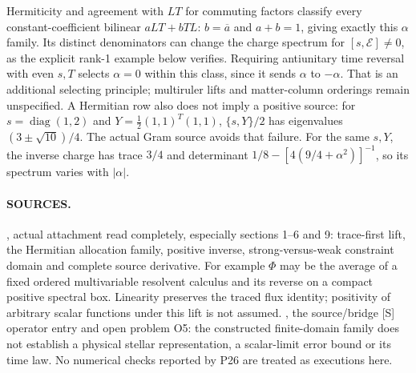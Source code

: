 Hermiticity and agreement with $LT$ for commuting factors classify
every constant-coefficient bilinear $aLT+bTL$:
$b=\overline a$ and $a+b=1$, giving exactly this $\alpha$ family.
Its distinct denominators can change the charge spectrum for
$[s,\mathcal E]\ne0$, as the explicit rank-1 example below verifies.
Requiring antiunitary time reversal with even $s,T$ selects
$\alpha=0$ within this class, since it sends $\alpha$ to $-\alpha$.
That is an additional selecting principle; multiruler lifts and
matter-column orderings remain unspecified.
A Hermitian row also does not imply a positive source:
for $s=\operatorname{diag}(1,2)$ and
$Y=\tfrac12(1,1)^T(1,1)$, $\{s,Y\}/2$ has eigenvalues
$(3\pm\sqrt{10})/4$.
The actual Gram source avoids that failure.
For the same $s,Y$, the inverse charge has trace $3/4$ and determinant
$1/8-[4(9/4+\alpha^2)]^{-1}$, so its spectrum varies with $|\alpha|$.

\paragraph*{SOURCES.}
\begingroup\footnotesize
{},
actual attachment read completely, especially sections 1--6 and 9:
trace-first lift, the Hermitian allocation family, positive inverse,
strong-versus-weak constraint domain and complete source derivative.
For example $\Phi$ may be the average of a fixed ordered
multivariable resolvent calculus and its reverse on a compact
positive spectral box.  Linearity preserves the traced flux identity;
positivity of arbitrary scalar functions under this lift is not assumed.
,
the source/bridge [S] operator entry and open problem O5:
the constructed finite-domain family does not establish a physical
stellar representation, a scalar-limit error bound or its time law.
No numerical checks reported by P26 are treated as executions here.
\endgroup
